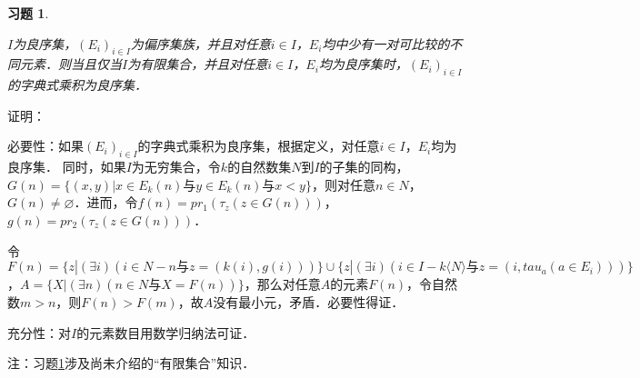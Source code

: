 \documentclass[12pt, a4paper, oneside]{book}
\newtheorem{exer}{习题}
\begin{document}
			\begin{exer}\label{exer111}
				\hfill\par
				$I$为良序集，$(E_i)_{i\in I}$为偏序集族，并且对任意$i\in I$，$E_i$均中少有一对可比较的不同元素．则当且仅当$I$为有限集合，并且对任意$i\in I$，$E_i$均为良序集时，$(E_i)_{i\in I}$的字典式乘积为良序集．
			\end{exer}
			证明：
			\par
			必要性：如果$(E_i)_{i\in I}$的字典式乘积为良序集，根据定义，对任意$i\in I$，$E_i$均为良序集．
			同时，如果$I$为无穷集合，令$k$的自然数集$N$到$I$的子集的同构，$G(n)=\{(x, y)|x\in E_k(n)\text{与}y\in E_k(n) \text{与}x<y\}$，则对任意$n \in N$，$G(n)\neq \varnothing$．进而，令$f(n)=pr_1(\tau_z(z\in G(n)))$，$g(n)=pr_2(\tau_z(z\in G(n)))$．
			\par
			令$F(n)=\{z|(\exists i)(i\in N-{n}\text{与}z=(k(i), g(i)))\}\cup\{z|(\exists i)(i\in I-k\langle N\rangle\text{与}z=(i, tau_a(a\in E_i)))\}$，$A=\{X|(\exists n)(n\in N\text{与}X=F(n))\}$，那么对任意$A$的元素$F(n)$，令自然数$m>n$，则$F(n)>F(m)$，故$A$没有最小元，矛盾．必要性得证．
			\par
			充分性：对$I$的元素数目用数学归纳法可证．
			\par
			注：习题\ref{exer111}涉及尚未介绍的“有限集合”知识．
			
\end{document}
